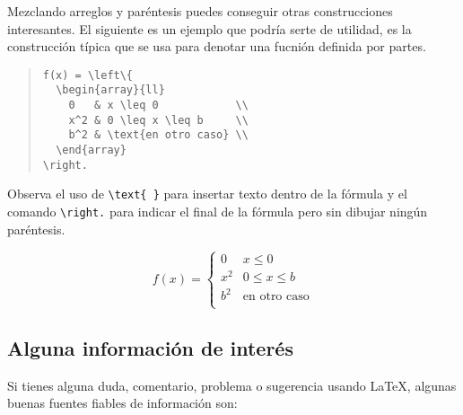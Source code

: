 Mezclando  arreglos y par\'entesis puedes conseguir
otras construcciones interesantes. El siguiente es un ejemplo que podr\'ia serte de utilidad,
es la construcci\'on t\'ipica que se usa para denotar una fucni\'on definida por partes.

\begin{quote}
\begin{verbatim}
f(x) = \left\{
  \begin{array}{ll}
    0   & x \leq 0            \\
    x^2 & 0 \leq x \leq b     \\
    b^2 & \text{en otro caso} \\
  \end{array}
\right.
\end{verbatim}
\end{quote}

Observa el uso de \verb|\text{ }| para insertar texto dentro de la f\'ormula y
el comando \verb|\right.| para indicar el final de la f\'ormula pero sin dibujar
ning\'un par\'entesis.

\begin{displaymath}
f(x) = \left\{
  \begin{array}{ll}
    0   & x \leq 0            \\
    x^2 & 0 \leq x \leq b     \\
    b^2 & \text{en otro caso} \\
  \end{array}
\right.
\end{displaymath}


\subsection{Alguna informaci\'on de inter\'es}\label{adicional}

Si tienes alguna duda, comentario, problema o sugerencia usando \LaTeX{},
algunas buenas fuentes fiables de informaci\'on son:

